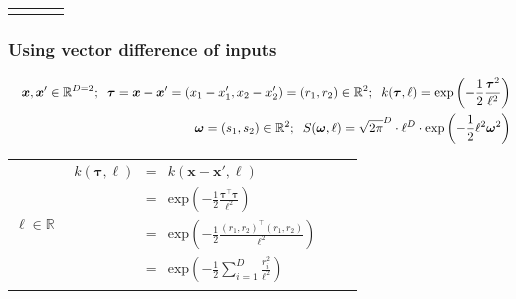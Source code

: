 \documentclass[]{interact}
\theoremstyle{plain}%
\theoremstyle{definition}
\theoremstyle{remark}
\begin{document}
\begin{landscape}
\begin{table}[H]
\begin{center}
\begin{tabular}{|c|c|c|c|}
       & \multicolumn{1}{|p{5.2cm}|}{

       } \\          
       \hline\\   
    \end{tabular}
  \end{center}
\end{table}


\newpage	
\subsubsection{Using vector difference of inputs}
\vspace{-5mm}

\begin{table}[H]
\small
\begin{eqnarray*}
\vspace{-10mm}
&&\bm{x}, \bm{x}' \in \mathbb{R}^{D=2}; \hspace{2mm}\bm{\tau} =\bm{x}-\bm{x}' = (x_1-x_1',x_2-x_2') = (r_1,r_2) \in \mathbb{R}^2; \hspace{2mm} k(\bm{\tau},\ell) = \mathrm{exp}\left(-\frac{1}{2} \frac{\bm{\tau}^2}{\ell^2} \right)\\
&& \bm{\omega}= (s_1,s_2) \in \mathbb{R}^2; \hspace{2mm} S(\bm{\omega},\ell) = \sqrt{2\pi}^D \cdot \ell^D \cdot \mathrm{exp}\left(-\frac{1}{2} \ell^2 \bm{\omega}^2 \right)
\end{eqnarray*}
\normalsize
  \begin{center}
    \begin{tabular}{|c|c|c|c|}
    
       \hline
       \multicolumn{1}{|p{1.5cm}|}{
       \vspace{1mm}
       $\ell \in \mathbb{R}$
       }
       
        & \multicolumn{1}{|p{7.2cm}|}{
         \begin{eqnarray*}
		k(\bm{\tau},\ell) &=& k(\bm{x}-\bm{x}',\ell)\\
		&=& \mathrm{exp}\left(-\frac{1}{2} \frac{\bm{\tau}^\top \bm{\tau}}{\ell^2} \right)\\
		&=& \mathrm{exp}\left(-\frac{1}{2} \frac{(r_1, r_2)^\top (r_1, r_2)}{\ell^2} \right)\\
		&=& \mathrm{exp}\left(-\frac{1}{2} \sum_{i=1}^{D}\frac{r_i^2}{\ell^2} \right)
         \end{eqnarray*}
       }
       

\end{tabular}
\end{center}
\end{table}
\end{landscape}
\end{document}
